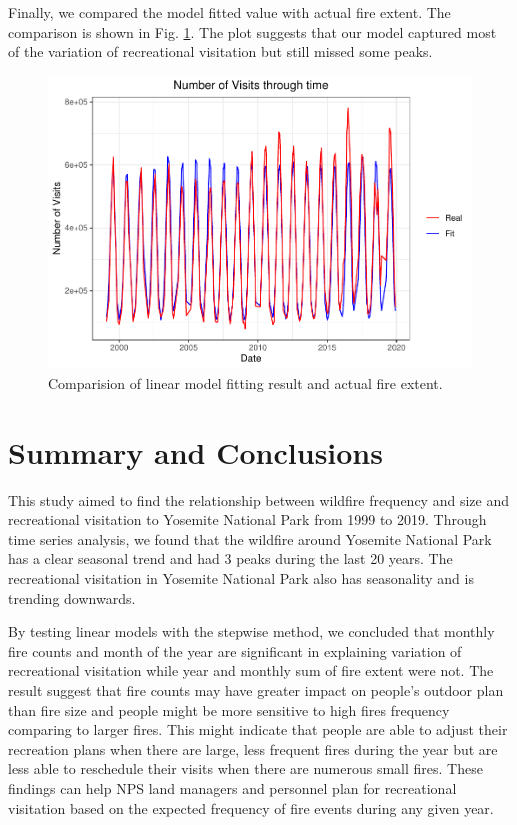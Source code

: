 \documentclass[
  12pt,
]{article}
\begin{document}
Finally, we compared the model fitted value with actual fire extent. The comparison is shown in Fig. \ref{fig:fitplot}. The plot suggests that our model captured most of the variation of recreational visitation but still missed some peaks.

\begin{figure}
\centering
\includegraphics{CodeFinal_files/figure-latex/fitplot-1.pdf}
\caption{\label{fig:fitplot}Comparision of linear model fitting result and actual fire extent.}
\end{figure}

\newpage

\hypertarget{summary-and-conclusions}{%
\section{Summary and Conclusions}\label{summary-and-conclusions}}

This study aimed to find the relationship between wildfire frequency and size and recreational visitation to Yosemite National Park from 1999 to 2019. Through time series analysis, we found that the wildfire around Yosemite National Park has a clear seasonal trend and had 3 peaks during the last 20 years. The recreational visitation in Yosemite National Park also has seasonality and is trending downwards.

By testing linear models with the stepwise method, we concluded that monthly fire counts and month of the year are significant in explaining variation of recreational visitation while year and monthly sum of fire extent were not. The result suggest that fire counts may have greater impact on people's outdoor plan than fire size and people might be more sensitive to high fires frequency comparing to larger fires. This might indicate that people are able to adjust their recreation plans when there are large, less frequent fires during the year but are less able to reschedule their visits when there are numerous small fires. These findings can help NPS land managers and personnel plan for recreational visitation based on the expected frequency of fire events during any given year.
\end{document}

